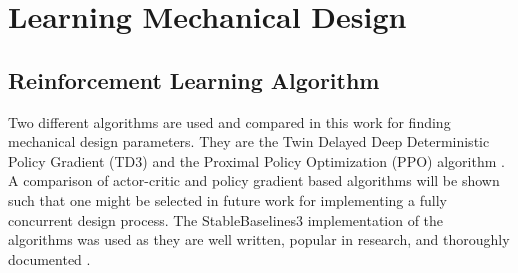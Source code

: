 \documentclass[10pt,twocolumn,letterpaper]{article}
\begin{document}

\section{Learning Mechanical Design}
\label{sec:learning_mech_params}
\subsection{Reinforcement Learning Algorithm}
%
Two different algorithms are used and compared in this work for finding mechanical design parameters. They are the Twin Delayed Deep Deterministic Policy Gradient (TD3) and the Proximal Policy Optimization (PPO) algorithm \cite{Fujimoto2018d, Schulman2017f}. A comparison of actor-critic and policy gradient based algorithms will be shown such that one might be selected in future work for implementing a fully concurrent design process. The StableBaselines3 implementation of the algorithms was used as they are well written, popular in research, and thoroughly documented \cite{stable-baselines3}.
\end{document}
